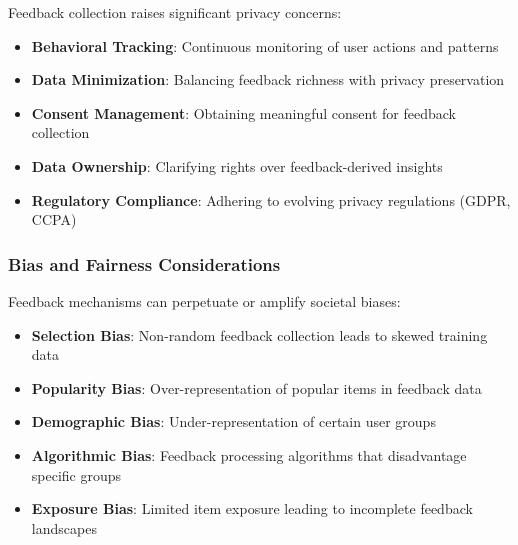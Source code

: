 Feedback collection raises significant privacy concerns:

\begin{itemize}
    \item \textbf{Behavioral Tracking}: Continuous monitoring of user actions and patterns
    \item \textbf{Data Minimization}: Balancing feedback richness with privacy preservation
    \item \textbf{Consent Management}: Obtaining meaningful consent for feedback collection
    \item \textbf{Data Ownership}: Clarifying rights over feedback-derived insights
    \item \textbf{Regulatory Compliance}: Adhering to evolving privacy regulations (GDPR, CCPA)
\end{itemize}

\subsubsection{Bias and Fairness Considerations}

Feedback mechanisms can perpetuate or amplify societal biases:

\begin{itemize}
    \item \textbf{Selection Bias}: Non-random feedback collection leads to skewed training data
    \item \textbf{Popularity Bias}: Over-representation of popular items in feedback data
    \item \textbf{Demographic Bias}: Under-representation of certain user groups
    \item \textbf{Algorithmic Bias}: Feedback processing algorithms that disadvantage specific groups
    \item \textbf{Exposure Bias}: Limited item exposure leading to incomplete feedback landscapes
\end{itemize}

